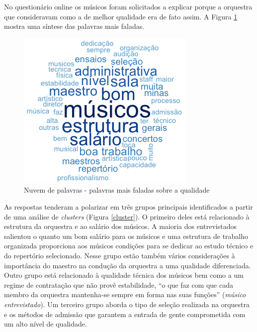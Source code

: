 \documentclass[a4paper, 12pt, openright, oneside, german, french, english, brazil]{abntex2}
\begin{document}
	No questionário online os músicos foram solicitados a explicar porque a orquestra que consideravam como a de melhor qualidade era de fato assim. A Figura \ref{wordcloud} mostra uma síntese das palavras mais faladas.
	
	\begin{figure}[!ht]
		\centering
		\caption{Nuvem de palavras - palavras mais faladas sobre a qualidade}
		\label{wordcloud}
		\includegraphics[scale=.8]{qualidade_wordcloud.png}
	\end{figure}
	
	As respostas tenderam a polarizar em três grupos principais identificados a partir de uma análise de \textit{clusters} (Figura \ref{cluster}). O primeiro deles está relacionado à estrutura da orquestra e ao salário dos músicos. A maioria dos entrevistados salientou o quanto um bom salário para os músicos e uma estrutura de trabalho organizada proporciona aos músicos condições para se dedicar ao estudo técnico e do repertório selecionado. Nesse grupo estão também vários considerações à importância do maestro na condução da orquestra a uma qualidade diferenciada. Outro grupo está relacionado à qualidade técnica dos músicos bem como a um regime de contratação que não provê estabilidade, ``o que faz com que cada membro da orquestra mantenha-se sempre em forma nas suas funções'' (\textit{músico entrevistado}). Um terceiro grupo aborda o tipo de seleção realizada na orquestra e os métodos de admissão que garantem a entrada de gente comprometida com um alto nível de qualidade.
	
\end{document}
